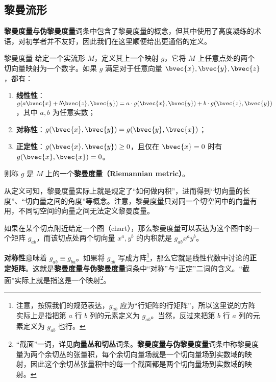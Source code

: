 



\subsection{黎曼流形}\label{sub_RieCon_1}

\textbf{黎曼度量与伪黎曼度量}词条中包含了黎曼度量的概念，但其中使用了高度凝练的术语，对初学者并不友好，因此我们在这里顺便给出更通俗的定义。

\begin{definition}{黎曼度量}
给定一个实流形 $M$，定义其上一个映射 $g$，它将 $M$ 上任意点处的两个切向量映射为一个数字。如果 $g$ 满足对于任意向量 $\bvec{x}, \bvec{y}, \bvec{z}$，都有：
\begin{enumerate}
\item \textbf{线性性}：$g(a\bvec{x}+b\bvec{z}, \bvec{y})=a\cdot g(\bvec{x}, \bvec{y})+b\cdot g(\bvec{z}, \bvec{y})$，其中 $a, b$ 为任意实数；
\item \textbf{对称性}：$g(\bvec{x}, \bvec{y})=g(\bvec{y}, \bvec{x})$；
\item \textbf{正定性}：$g(\bvec{x}, \bvec{y})\geq 0$，且仅在 $\bvec{x}=0$ 时有 $g(\bvec{x}, \bvec{x})=0$。
\end{enumerate}
则称 $g$ 是 $M$ 上的一个\textbf{黎曼度量（Riemannian metric）}。
\end{definition}

从定义可知，黎曼度量实际上就是规定了“如何做内积”，进而得到“切向量的长度”、“切向量之间的角度”等概念。注意，黎曼度量只对同一个切空间中的向量有用，不同切空间的向量之间无法定义黎曼度量。

如果在某个切点附近给定一个图（chart），那么黎曼度量可以表达为这个图中的一个矩阵 $g_{ab}$，而该切点处两个切向量 ${x}^a, {y}^b$ 的内积就是 $g_{ab}{x}^a{y}^b$。

\textbf{对称性}意味着 $g_{ab}\equiv g_{ba}$。如果将 $g_{ab}$ 写成方阵\footnote{注意，按照我们的规范表达，$g_{ab}$ 应为“行矩阵的行矩阵”，所以这里说的方阵实际上是指把第 $a$ 行 $b$ 列的元素定义为 $g_{ab}$。当然，反过来把第 $b$ 行 $a$ 列的元素定义为 $g_{ab}$ 也行。}，那么它就是线性代数中讨论的\textbf{正定矩阵}。这就是\textbf{黎曼度量与伪黎曼度量}词条中“对称”与“正定”二词的含义。“截面”实际上就是指这是一个映射\footnote{“截面”一词，详见\textbf{向量丛和切丛}词条。\textbf{黎曼度量与伪黎曼度量}词条中称黎曼度量为两个余切丛的张量积，每个余切向量场就是一个切向量场到实数域的映射，因此这个余切丛张量积中的每一个截面都是两个切向量场到实数域的映射。}。


